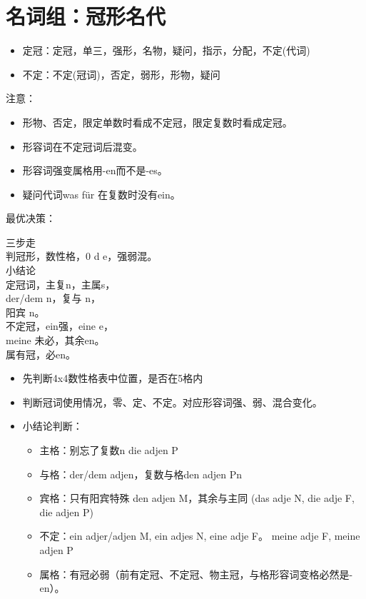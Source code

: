 \chapter{名词组：冠形名代}
\begin{itemize}
    \item 定冠：定冠，单三，强形，名物，疑问，指示，分配，不定(代词)
    \item 不定：不定(冠词)，否定，弱形，形物，疑问
\end{itemize}

注意：
\begin{itemize}
    \item 形物、否定，限定单数时看成不定冠，限定复数时看成定冠。
    \item 形容词在不定冠词后混变。
    \item 形容词强变属格用-en而不是-es。
    \item 疑问代词was für 在复数时没有ein。
\end{itemize}

最优决策：
\begin{myquote}
    \begin{center}
        三步走 \\
        判冠形，数性格，0 d e，强弱混。 \\
        小结论 \\
        定冠词，主复n，主属s，\\
        der/dem n，复与 n，\\
        阳宾 n。 \\
        不定冠，ein强，eine e，\\
        meine 未必，其余en。 \\
        属有冠，必en。
    \end{center}
\end{myquote}
\begin{itemize}
    \item 先判断4x4数性格表中位置，是否在5格内
    \item 判断冠词使用情况，零、定、不定。对应形容词强、弱、混合变化。
    \item 小结论判断：
          \begin{itemize}
              \item 主格：别忘了复数n die adjen P
              \item 与格：der/dem adjen，复数与格den adjen Pn
              \item 宾格：只有阳宾特殊 den adjen M，其余与主同 (das adje N, die adje F, die adjen P)
              \item 不定：ein adjer/adjen M, ein adjes N, eine adje F。 meine adje F, meine adjen P
              \item 属格：有冠必弱（前有定冠、不定冠、物主冠，与格形容词变格必然是-en）。
          \end{itemize}
\end{itemize}

